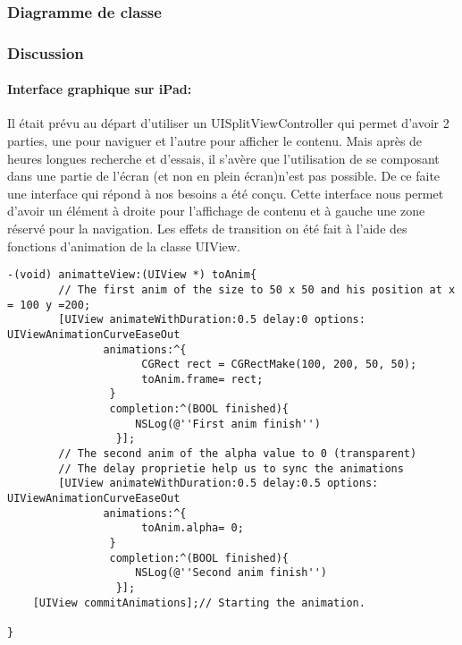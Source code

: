 					\subsubsection*{Diagramme de classe}
					\subsubsection*{Discussion}
	
					\paragraph{Interface graphique sur iPad:} Il était prévu au départ d'utiliser un UISplitViewController qui permet d'avoir 2 parties, une pour naviguer et l'autre pour afficher le contenu. Mais après de heures longues recherche et d'essais, il s'avère que l'utilisation de se composant dans une partie de l'écran (et non en plein écran)n'est pas possible. De ce faite une interface qui répond à nos besoins a été conçu. Cette interface nous permet d'avoir un élément à droite pour l'affichage de contenu et à gauche une zone réservé pour la navigation. Les effets de transition on été fait à l'aide des fonctions d'animation de la classe UIView. 
	\lstset{
			    style = Xcode,
			    caption=Exemple de 2 animations à l'aide de la classe UIView. La première change la taille  et l'emplacement d'un élément graphique et la deuxième change sa transparence.,
			    breaklines=true,
			    frame=single
			}

\begin{lstlisting}[name=Animation UIView  , label=animateWithDuration]
-(void) animatteView:(UIView *) toAnim{
		// The first anim of the size to 50 x 50 and his position at x = 100 y =200;
        [UIView animateWithDuration:0.5 delay:0 options: UIViewAnimationCurveEaseOut
               animations:^{
                     CGRect rect = CGRectMake(100, 200, 50, 50);
                     toAnim.frame= rect;
                } 
                completion:^(BOOL finished){
					NSLog(@''First anim finish'')
                 }];
		// The second anim of the alpha value to 0 (transparent)
		// The delay proprietie help us to sync the animations
        [UIView animateWithDuration:0.5 delay:0.5 options: UIViewAnimationCurveEaseOut
               animations:^{
                     toAnim.alpha= 0;
                } 
                completion:^(BOOL finished){
					NSLog(@''Second anim finish'')
                 }];
    [UIView commitAnimations];// Starting the animation.

}
\end{lstlisting}

